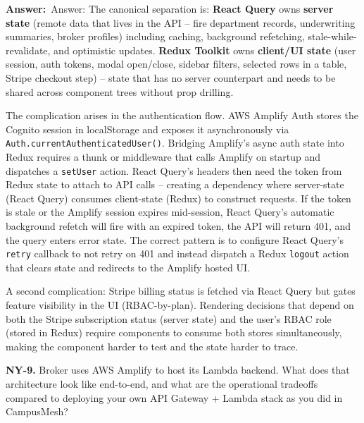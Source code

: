 \documentclass[letterpaper,10pt]{article}
\newlength{\boxwidth}
\newcommand{\answerlabel}{\noindent\textbf{\textcolor{answerblue}{Answer:}}~}
\begin{document}
\vspace{2pt}
\answerlabel{Answer:} The canonical separation is: \textbf{React Query} owns \textbf{server state} (remote data that lives in the API -- fire department records, underwriting summaries, broker profiles) including caching, background refetching, stale-while-revalidate, and optimistic updates. \textbf{Redux Toolkit} owns \textbf{client/UI state} (user session, auth tokens, modal open/close, sidebar filters, selected rows in a table, Stripe checkout step) -- state that has no server counterpart and needs to be shared across component trees without prop drilling.

The complication arises in the authentication flow. AWS Amplify Auth stores the Cognito session in localStorage and exposes it asynchronously via \texttt{Auth.currentAuthenticatedUser()}. Bridging Amplify's async auth state into Redux requires a thunk or middleware that calls Amplify on startup and dispatches a \texttt{setUser} action. React Query's headers then need the token from Redux state to attach to API calls -- creating a dependency where server-state (React Query) consumes client-state (Redux) to construct requests. If the token is stale or the Amplify session expires mid-session, React Query's automatic background refetch will fire with an expired token, the API will return 401, and the query enters error state. The correct pattern is to configure React Query's \texttt{retry} callback to not retry on 401 and instead dispatch a Redux \texttt{logout} action that clears state and redirects to the Amplify hosted UI.

A second complication: Stripe billing status is fetched via React Query but gates feature visibility in the UI (RBAC-by-plan). Rendering decisions that depend on both the Stripe subscription status (server state) and the user's RBAC role (stored in Redux) require components to consume both stores simultaneously, making the component harder to test and the state harder to trace.

\vspace{6pt}

\colorbox{qbg}{\begin{minipage}{\boxwidth}
\textbf{NY-9.} Broker uses AWS Amplify to host its Lambda backend. What does that architecture look like end-to-end, and what are the operational tradeoffs compared to deploying your own API Gateway + Lambda stack as you did in CampusMesh?
\end{minipage}}
\end{document}
